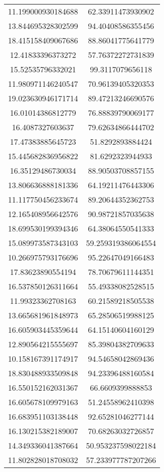 \begin{table}
\begin{tabular}{cc}
11.199000930184688 & 62.33911473930902 \\
13.844695328302599 & 94.40408586355456 \\
18.415158409067686 & 88.86041775641779 \\
12.41833396373272 & 57.76372272731839 \\
15.52535796332021 & 99.3117079656118 \\
11.980971146240547 & 70.96139405320353 \\
19.023630946171714 & 89.47213246690576 \\
16.01014386812779 & 76.88839790069177 \\
16.4087327603637 & 79.62634866444702 \\
17.47383885645723 & 51.8292893884424 \\
15.445682836956822 & 81.6292323944933 \\
16.35129486730034 & 88.90503708857155 \\
13.806636888181336 & 64.19211476443306 \\
11.117750456233674 & 89.20644352362753 \\
12.165408956642576 & 90.98721857035638 \\
18.699530199394346 & 64.38064550541333 \\
15.089973587343103 & 59.259319386064554 \\
10.266975793176696 & 95.22647049166483 \\
17.83623890554194 & 78.70679611144351 \\
16.537850126311664 & 55.49338082528515 \\
11.99323362708163 & 60.21589218505538 \\
13.665681961848973 & 65.28506519988125 \\
16.605903445359644 & 64.15140604160129 \\
12.890564215555697 & 85.39804382709633 \\
10.158167391174917 & 94.54658042869436 \\
18.830488933509848 & 94.23396488160584 \\
16.550152162031367 & 66.6609399888853 \\
16.605678109979163 & 51.24558962410398 \\
16.683951103138448 & 92.65281046277144 \\
16.130215382189007 & 70.68263032726857 \\
14.349336041387664 & 50.953237598022184 \\
11.802828018708032 & 57.233977787207266 \\

\end{tabular}
\end{table}
